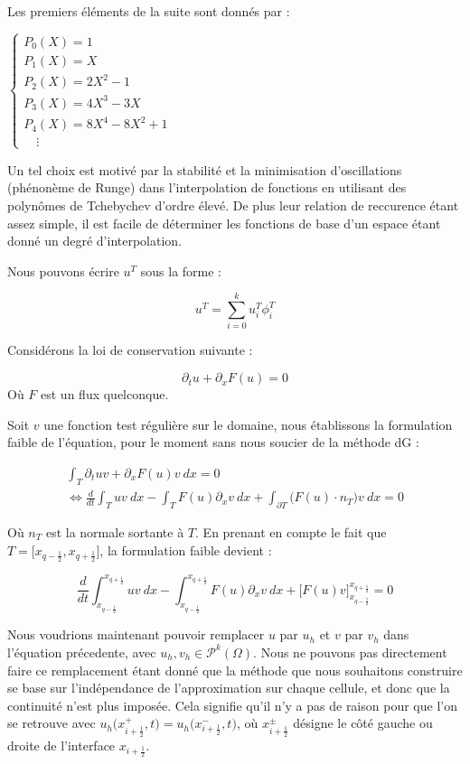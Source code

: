 Les premiers éléments de la suite sont donnés par :

$\begin{cases}
    P_0(X) = 1 \\
    P_1(X) = X \\
    P_2(X) = 2X^2 -1 \\
    P_3(X) = 4X^3 - 3X \\
    P_4(X) = 8X^4 - 8X^2 + 1 \\
    \quad \vdots
\end{cases}$

\vspace{1em}

Un tel choix est motivé par la stabilité et la minimisation d'oscillations (phénonème de Runge) dans l'interpolation de fonctions en utilisant des polynômes de Tchebychev d'ordre élevé. 
De plus leur relation de reccurence étant assez simple, il est facile de déterminer les fonctions de base d'un espace étant donné un degré d'interpolation.

Nous pouvons écrire $u^T$ sous la forme :

$$u^T = \sum_{i=0}^{k} u_i^T \phi_i^T$$

Considérons la loi de conservation suivante : 

$$\partial_t u + \partial_x F(u) = 0$$
Où $F$ est un flux quelconque. 

Soit $v$ une fonction test régulière sur le domaine, nous établissons la formulation faible de l'équation, pour le moment sans nous soucier de la méthode dG :

\begin{equation*}
\begin{split}
    \int_T  \partial_t u v + \partial_x F(u)v \ dx =0 \\
    \Leftrightarrow \frac{d}{dt}\int_T uv \ dx - \int_T F(u)\partial_x v \ dx + \int_{\partial T} \big(F(u)\cdot n_T \big)v \ dx = 0
\end{split}
\end{equation*}

Où $n_T$ est la normale sortante à $T$.
En prenant en compte le fait que $T = \big[x_{q-\frac{1}{2}}, x_{q+\frac{1}{2}} \big]$, la formulation faible devient :

$$\frac{d}{dt}\int_{x_{q-\frac{1}{2}}}^{x_{q+\frac{1}{2}}} uv \ dx - \int_{x_{q-\frac{1}{2}}}^{x_{q+\frac{1}{2}}} F(u)\partial_xv \ dx + \Big[ F(u)v \Big]_{x_{q-\frac{1}{2}}}^{x_{q+\frac{1}{2}}} = 0 $$

Nous voudrions maintenant pouvoir remplacer $u$ par $u_h$ et $v$ par $v_h$ dans l'équation précedente, avec $u_h,v_h \in \mathcal{P}^k(\Omega)$. 
Nous ne pouvons pas directement faire ce remplacement étant donné que la méthode que nous souhaitons construire se base sur l'indépendance de l'approximation sur chaque cellule, et donc que la continuité n'est plus imposée. Cela signifie qu'il n'y a pas de raison pour que l'on se retrouve avec $u_h\big(x^+_{i+\frac{1}{2}},t \big) = u_h\big( x^-_{i + \frac{1}{2}} ,t \big)$, où $x^{\pm}_{i + \frac{1}{2}}$ désigne le côté gauche ou droite de l'interface $x_{i+\frac{1}{2}}$.

